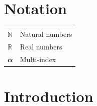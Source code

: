 \documentclass[12pt,a4paper,openany,twoside]{book}
\renewcommand{\v}[1]{\mathbfit{#1}}      %
\begin{document}
	
	\listoffigures
	\markboth{}{} 
	
	\newpage
	
	
	\listoftables
	\markboth{}{} 
	
	\newpage
	
	
	\chapter*{Notation}

	
			\begin{tabular}{p{4cm} l  }
			$\mathbb{N}$ & Natural numbers\\
			$\mathbb{R}$ & Real numbers\\
			$\v{\alpha}$ & Multi-index\\
		\end{tabular}
	
	
	\setlength{\parskip}{0.2ex}
	\setcounter{tocdepth}{1}
	\renewcommand{\baselinestretch}{0.95}\normalsize
	\tableofcontents
	\renewcommand{\baselinestretch}{1}\normalsize
	\markboth{}{} 
	\setlength{\parskip}{1ex}
	


\mainmatter



\chapter{Introduction}\label{intro-section}
\end{document}
